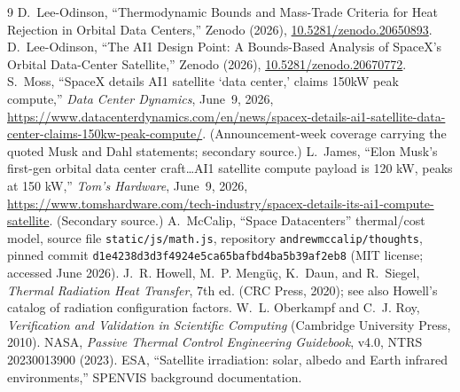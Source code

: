 \documentclass[11pt]{article}
\theoremstyle{remark}
\begin{document}
\begin{thebibliography}{9}
 D.~Lee-Odinson, ``Thermodynamic Bounds and Mass-Trade Criteria
for Heat Rejection in Orbital Data Centers,'' Zenodo (2026),
\href{https://doi.org/10.5281/zenodo.20650893}{10.5281/zenodo.20650893}.
 D.~Lee-Odinson, ``The AI1 Design Point: A Bounds-Based Analysis
of SpaceX's Orbital Data-Center Satellite,'' Zenodo (2026),
\href{https://doi.org/10.5281/zenodo.20670772}{10.5281/zenodo.20670772}.
 S.~Moss, ``SpaceX details AI1 satellite `data center,' claims
150kW peak compute,'' \emph{Data Center Dynamics}, June~9, 2026,
\url{https://www.datacenterdynamics.com/en/news/spacex-details-ai1-satellite-data-center-claims-150kw-peak-compute/}.
(Announcement-week coverage carrying the quoted Musk and Dahl statements; secondary
source.)
 L.~James, ``Elon Musk's first-gen orbital data center
craft\ldots AI1 satellite compute payload is 120 kW, peaks at 150 kW,''
\emph{Tom's Hardware}, June~9, 2026,
\url{https://www.tomshardware.com/tech-industry/spacex-details-its-ai1-compute-satellite}.
(Secondary source.)
 A.~McCalip, ``Space Datacenters'' thermal/cost model, source file
\texttt{static/js/math.js}, repository \texttt{andrewmccalip/thoughts}, pinned
commit \texttt{d1e4238d3d3f4924e5ca65bafbd4ba5b39af2eb8} (MIT license; accessed
June 2026).
 J.~R. Howell, M.~P. Mengüç, K.~Daun, and R.~Siegel,
\emph{Thermal Radiation Heat Transfer}, 7th ed. (CRC Press, 2020); see also
Howell's catalog of radiation configuration factors.
 W.~L. Oberkampf and C.~J. Roy, \emph{Verification and
Validation in Scientific Computing} (Cambridge University Press, 2010).
 NASA, \emph{Passive Thermal Control Engineering
Guidebook}, v4.0, NTRS 20230013900 (2023).
 ESA, ``Satellite irradiation: solar, albedo and Earth infrared
environments,'' SPENVIS background documentation.
\end{thebibliography}
\end{document}
